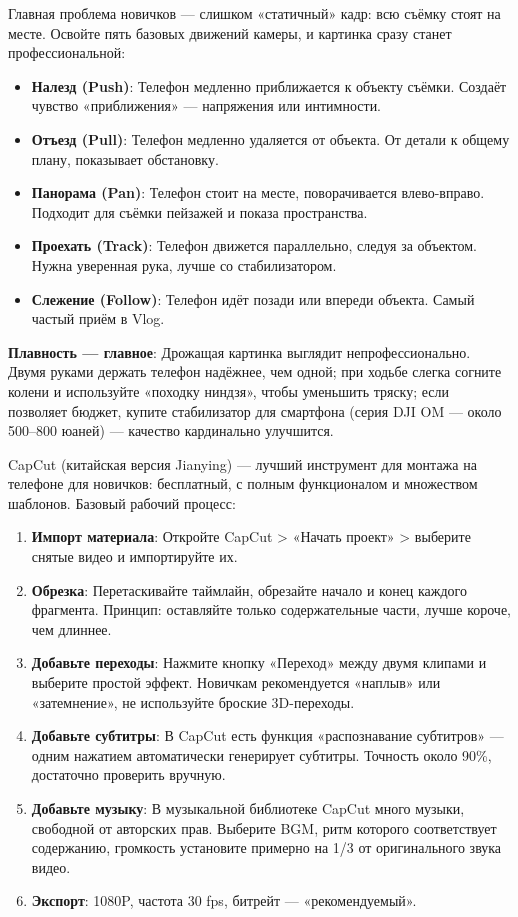 
Главная проблема новичков — слишком «статичный» кадр: всю съёмку стоят на месте. Освойте пять базовых движений камеры, и картинка сразу станет профессиональной:

\begin{itemize}
  \item \textbf{Налезд (Push)}: Телефон медленно приближается к объекту съёмки. Создаёт чувство «приближения» — напряжения или интимности.
  \item \textbf{Отъезд (Pull)}: Телефон медленно удаляется от объекта. От детали к общему плану, показывает обстановку.
  \item \textbf{Панорама (Pan)}: Телефон стоит на месте, поворачивается влево-вправо. Подходит для съёмки пейзажей и показа пространства.
  \item \textbf{Проехать (Track)}: Телефон движется параллельно, следуя за объектом. Нужна уверенная рука, лучше со стабилизатором.
  \item \textbf{Слежение (Follow)}: Телефон идёт позади или впереди объекта. Самый частый приём в Vlog.
\end{itemize}

\textbf{Плавность — главное}: Дрожащая картинка выглядит непрофессионально. Двумя руками держать телефон надёжнее, чем одной; при ходьбе слегка согните колени и используйте «походку ниндзя», чтобы уменьшить тряску; если позволяет бюджет, купите стабилизатор для смартфона (серия DJI OM — около 500–800 юаней) — качество кардинально улучшится.


CapCut (китайская версия Jianying) — лучший инструмент для монтажа на телефоне для новичков: бесплатный, с полным функционалом и множеством шаблонов. Базовый рабочий процесс:

\begin{enumerate}
  \item \textbf{Импорт материала}: Откройте CapCut > «Начать проект» > выберите снятые видео и импортируйте их.
  \item \textbf{Обрезка}: Перетаскивайте таймлайн, обрезайте начало и конец каждого фрагмента. Принцип: оставляйте только содержательные части, лучше короче, чем длиннее.
  \item \textbf{Добавьте переходы}: Нажмите кнопку «Переход» между двумя клипами и выберите простой эффект. Новичкам рекомендуется «наплыв» или «затемнение», не используйте броские 3D-переходы.
  \item \textbf{Добавьте субтитры}: В CapCut есть функция «распознавание субтитров» — одним нажатием автоматически генерирует субтитры. Точность около 90\%, достаточно проверить вручную.
  \item \textbf{Добавьте музыку}: В музыкальной библиотеке CapCut много музыки, свободной от авторских прав. Выберите BGM, ритм которого соответствует содержанию, громкость установите примерно на 1/3 от оригинального звука видео.
  \item \textbf{Экспорт}: 1080P, частота 30 fps, битрейт — «рекомендуемый».
\end{enumerate}

